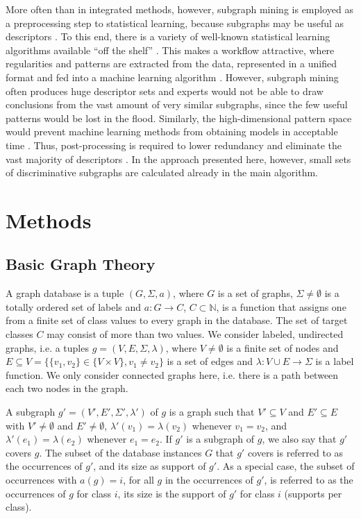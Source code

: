 \documentclass{article}
\begin{document}
More often than in integrated methods, however, subgraph mining is employed as
a preprocessing step to statistical learning, because subgraphs may be useful as
descriptors \cite{bringmann10lego,schietgat09mcsfeatures}. To this end, there
is a variety of well-known statistical learning algorithms available ``off the
shelf'' \cite{hall09weka,r08language}. This makes a workflow attractive, where
regularities and patterns are extracted from the data, represented in a unified
format and fed into a machine learning algorithm \cite{hkr03molfea}.  However,
subgraph mining often produces huge descriptor sets and experts would not be
able to draw conclusions from the vast amount of very similar subgraphs, since
the few useful patterns would be lost in the flood. Similarly, the
high-dimensional pattern space would prevent machine learning methods from
obtaining models in acceptable time \cite{Hasan_origami:mining}. Thus,
post-processing is required to lower redundancy and eliminate the vast majority
of descriptors \cite{schietgat09mcsfeatures, CMNK01Frequent, Jun04Spin}. In
the approach presented here, however, small sets of discriminative subgraphs are calculated
already in the main algorithm.





\section{Methods}

\subsection{Basic Graph Theory}
\label{ss:BasicGraphTheory}
A graph database is a tuple $(G, \Sigma, a)$, where $G$ is a set of graphs,
$\Sigma \ne \emptyset$  is a totally ordered set of labels and $a: G
\rightarrow C$, $C \subset \mathbb{N}$, is a function that assigns one from a
finite set of class values to every graph in the database.  The set of target
classes $C$ may consist of more than two values.  We consider labeled,
undirected graphs, i.e. a tuples $g=(V,E,\Sigma,\lambda)$, where $V\ne
\emptyset$ is a finite set of nodes and $E \subseteq V = \{\{v_1, v_2\} \in \{V
\times V\}, v_1 \ne v_2\}$ is a set of edges and $\lambda: V\cup E \rightarrow
\Sigma$ is a label function.  We only consider connected graphs here, i.e.
there is a path between each two nodes in the graph.

A subgraph $g'=(V',E',\Sigma',\lambda')$ of $g$ is a graph such that $V'
\subseteq V$ and $E' \subseteq E$ with $V' \ne \emptyset$ and $E' \ne
\emptyset$, $\lambda'(v_1)=\lambda(v_2)$ whenever $v_1=v_2$, and
$\lambda'(e_1)=\lambda(e_2)$ whenever $e_1=e_2$.  If $g'$ is a subgraph of $g$,
we also say that $g'$ covers $g$.  The subset of the database instances $G$
that $g'$ covers is referred to as the occurrences of $g'$, and its size as
support of $g'$.  As a special case, the subset of occurrences with $a(g)=i$,
for all $g$ in the occurrences of $g'$, is referred to as the 
occurrences of $g$ for class $i$, its size is the support of $g'$ for class
$i$ (supports per class).
\end{document}

